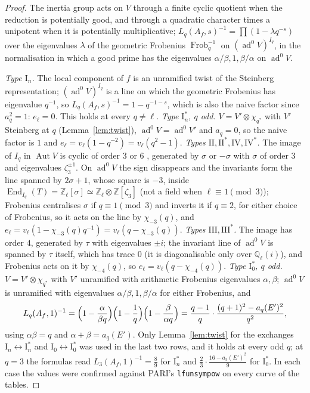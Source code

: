 \documentclass[11pt]{amsart}
\theoremstyle{definition}
\newcommand{\Q}{\mathbb{Q}}
\newcommand{\Z}{\mathbb{Z}}
\newcommand{\ad}{\operatorname{ad}^0}
\newcommand{\Frob}{\operatorname{Frob}}
\begin{document}
\begin{proof}
The inertia group acts on $V$ through a finite cyclic quotient when the reduction is potentially good, and through a quadratic character times a unipotent when it is potentially multiplicative; $L_q(A_f,s)^{-1}=\prod(1-\lambda q^{-s})$ over the eigenvalues $\lambda$ of the geometric Frobenius $\Frob_q^{-1}$ on $(\ad V)^{I_q}$, in the normalisation in which a good prime has the eigenvalues $\alpha/\beta,1,\beta/\alpha$ on $\ad V$.

\emph{Type $\mathrm{I}_n$.} The local component of $f$ is an unramified twist of the Steinberg representation; $(\ad V)^{I_q}$ is a line on which the geometric Frobenius has eigenvalue $q^{-1}$, so $L_q(A_f,s)^{-1}=1-q^{-1-s}$, which is also the naive factor since $a_q^2=1$: $e_\ell=0$. This holds at every $q\ne\ell$. \emph{Type $\mathrm{I}_n^*$, $q$ odd.} $V=V'\otimes\chi_{q^*}$ with $V'$ Steinberg at $q$ (Lemma~\ref{lem:twist}), $\ad V=\ad V'$ and $a_q=0$, so the naive factor is $1$ and $e_\ell=v_\ell(1-q^{-2})=v_\ell(q^2-1)$. \emph{Types $\mathrm{II},\mathrm{II}^*,\mathrm{IV},\mathrm{IV}^*$.} The image of $I_q$ in $\operatorname{Aut}V$ is cyclic of order $3$ or $6$ \cite{Kraus90}, generated by $\sigma$ or $-\sigma$ with $\sigma$ of order $3$ and eigenvalues $\zeta_3^{\pm1}$. On $\ad V$ the sign disappears and the invariants form the line spanned by $2\sigma+1$, whose square is $-3$, inside $\operatorname{End}_{I_q}(T)=\Z_\ell[\sigma]\simeq\Z_\ell\otimes\Z[\zeta_3]$ (not a field when $\ell\equiv1\pmod3$); Frobenius centralises $\sigma$ if $q\equiv1\pmod3$ and inverts it if $q\equiv2$, for either choice of Frobenius, so it acts on the line by $\chi_{-3}(q)$, and $e_\ell=v_\ell(1-\chi_{-3}(q)q^{-1})=v_\ell(q-\chi_{-3}(q))$. \emph{Types $\mathrm{III},\mathrm{III}^*$.} The image has order $4$, generated by $\tau$ with eigenvalues $\pm i$; the invariant line of $\ad V$ is spanned by $\tau$ itself, which has trace $0$ (it is diagonalisable only over $\Q_\ell(i)$), and Frobenius acts on it by $\chi_{-4}(q)$, so $e_\ell=v_\ell(q-\chi_{-4}(q))$. \emph{Type $\mathrm{I}_0^*$, $q$ odd.} $V=V'\otimes\chi_{q^*}$ with $V'$ unramified with arithmetic Frobenius eigenvalues $\alpha,\beta$; $\ad V$ is unramified with eigenvalues $\alpha/\beta,1,\beta/\alpha$ for either Frobenius, and
\[
L_q(A_f,1)^{-1}=\Bigl(1-\frac{\alpha}{\beta q}\Bigr)\Bigl(1-\frac1q\Bigr)\Bigl(1-\frac{\beta}{\alpha q}\Bigr)=\frac{q-1}{q}\cdot\frac{(q+1)^2-a_q(E')^2}{q^2},
\]
using $\alpha\beta=q$ and $\alpha+\beta=a_q(E')$. Only Lemma~\ref{lem:twist} for the exchanges $\mathrm{I}_n\leftrightarrow\mathrm{I}_n^*$ and $\mathrm{I}_0\leftrightarrow\mathrm{I}_0^*$ was used in the last two rows, and it holds at every odd $q$; at $q=3$ the formulas read $L_3(A_f,1)^{-1}=\frac89$ for $\mathrm{I}_n^*$ and $\frac23\cdot\frac{16-a_3(E')^2}9$ for $\mathrm{I}_0^*$. In each case the values were confirmed against PARI's \texttt{lfunsympow} on every curve of the tables.
\end{proof}
\end{document}
